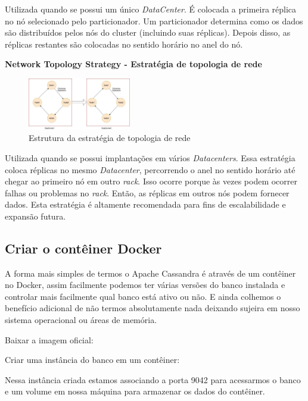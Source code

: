 \documentclass[a4paper,11pt]{article}
\begin{document}
Utilizada quando se possui um único \textit{DataCenter}. É colocada a primeira réplica no nó selecionado pelo particionador. Um particionador determina como os dados são distribuídos pelos nós do cluster (incluindo suas réplicas). Depois disso, as réplicas restantes são colocadas no sentido horário no anel do nó.

\textbf{Network Topology Strategy - Estratégia de topologia de rede}
\begin{figure}[H]
	\centering
	\includegraphics[width=0.4\textwidth]{imagens/networkStrategy.jpg}
	\caption{Estrutura da estratégia de topologia de rede}
\end{figure}

Utilizada quando se possui implantações em vários \textit{Datacenters}. Essa estratégia coloca réplicas no mesmo \textit{Datacenter}, percorrendo o anel no sentido horário até chegar ao primeiro nó em outro \textit{rack}. Isso ocorre porque às vezes podem ocorrer falhas ou problemas no \textit{rack}. Então, as réplicas em outros nós podem fornecer dados. Esta estratégia é altamente recomendada para fins de escalabilidade e expansão futura. 

\subsection{Criar o contêiner Docker}
A forma mais simples de termos o Apache Cassandra é através de um contêiner no Docker, assim facilmente podemos ter várias versões do banco instalada e controlar mais facilmente qual banco está ativo ou não. E ainda colhemos o benefício adicional de não termos absolutamente nada deixando sujeira em nosso sistema operacional ou áreas de memória.

Baixar a imagem oficial: \\

Criar uma instância do banco em um contêiner: \\

Nessa instância criada estamos associando a porta 9042 para acessarmos o banco e um volume em nossa máquina para armazenar os dados do contêiner.
\end{document}
